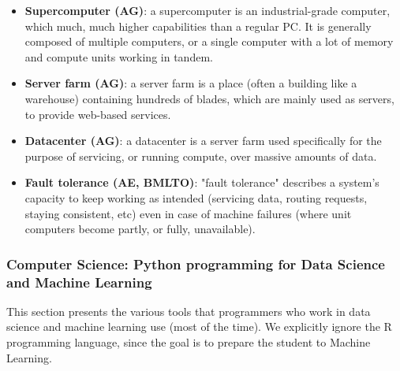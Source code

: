 \documentclass{article}
\begin{document}
\begin{itemize}
	\item \textbf{Supercomputer (AG)}: a supercomputer is an industrial-grade computer, which much, much higher capabilities than a regular PC. It is generally composed of multiple computers, or a single computer with a lot of memory and compute units working in tandem.

	\item \textbf{Server farm (AG)}: a server farm is a place (often a building like a warehouse) containing hundreds of blades, which are mainly used as servers, to provide web-based services.

	\item \textbf{Datacenter (AG)}: a datacenter is a server farm used specifically for the purpose of servicing, or running compute, over massive amounts of data.

	\item \textbf{Fault tolerance (AE, BMLTO)}: "fault tolerance" describes a system's capacity to keep working as intended (servicing data, routing requests, staying consistent, etc) even in case of machine failures (where unit computers become partly, or fully, unavailable).

\end{itemize}



\subsubsection*{Computer Science: Python programming for Data Science and Machine Learning}

This section presents the various tools that programmers who work in data science and machine learning use (most of the time). We explicitly ignore the R programming language, since the goal is to prepare the student to Machine Learning.
\end{document}
